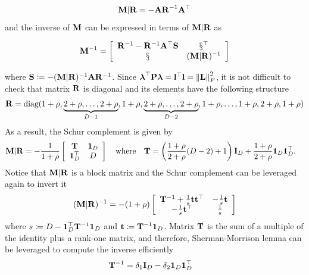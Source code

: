 \begin{equation}
	\mathbf{M}|\mathbf{R} = -\mathbf{A}\mathbf{R}^{-1}\mathbf{A}^\top
\end{equation}
and the inverse of $\mathbf{M}$ can be expressed in terms of $\mathbf{M}|\mathbf{R}$ as
\begin{small}
	\begin{equation}\label{eq:Minv_admm}
		\M^{-1} = \left[
		\begin{array}{cc}
			\Rm^{-1} - \Rm^{-1}\A^\top\S  & \S^\top \\
			\S & (\M|\Rm)^{-1}
		\end{array}
		\right]
	\end{equation}
\end{small}%
where $\S\coloneqq -(\M|\Rm)^{-1}\A\Rm^{-1}$. Since $\boldsymbol{\lambda}^\top \mathbf{P} \boldsymbol{\lambda}= \mathbf{l}^\top \mathbf{l} = \left\|\mathbf{L}\right\|_F^2$, it is not difficult to check that matrix $\mathbf{R}$ is diagonal and its elements have the following structure
\begin{equation}
	\mathbf{R}=\text{diag}(1+\rho, \underbrace{2+\rho,\ldots,2+\rho}_{D-1},1+\rho, \label{eq:R} 
	\underbrace{2+\rho,\ldots,2+\rho}_{D-2},1+\rho,\ldots,1+\rho,2+\rho,1+\rho) 
\end{equation}
As a result, the Schur complement is given by
\begin{align*}
	\mathbf{M}|\mathbf{R} &= -\frac{1}{1+\rho}\left[
	\begin{array}{cc}
		\mathbf{T}  & \mathbf{1}_D \\
		\mathbf{1}_D^\top & D
	\end{array}
	\right]\quad \text{where}\quad
	\mathbf{T} = \left(\frac{1+\rho}{2+\rho}(D-2)+1\right)\mathbf{I}_D + \frac{1+\rho}{2+\rho}\mathbf{1}_D\mathbf{1}_D^\top.
\end{align*}
Notice that $\mathbf{M}|\mathbf{R}$ is a block matrix and the Schur complement can be leveraged again to invert it
\begin{equation*}
	(\mathbf{M}|\mathbf{R})^{-1} = -(1+\rho)\left[
	\begin{array}{cc}
		\mathbf{T}^{-1} + \frac{1}{s}\mathbf{t}\mathbf{t}^\top  & -\frac{1}{s}\mathbf{t} \\
		-\frac{1}{s}\mathbf{t}^\top & \frac{1}{s}
	\end{array}
	\right]
\end{equation*}
where $s\coloneqq D-\mathbf{1}_D^\top\mathbf{T}^{-1}\mathbf{1}_D$ and $\mathbf{t}\coloneqq \mathbf{T}^{-1}\mathbf{1}_D$. Matrix $\mathbf{T}$ is the sum of a multiple of the identity plus a rank-one matrix, and therefore, Sherman-Morrison lemma can be leveraged to compute the inverse efficiently
\begin{align}
	&\mathbf{T}^{-1} = \delta_1\mathbf{I}_D - \delta_2\boldsymbol{1}_D\boldsymbol{1}_D^\top\label{eq:Mschur_inv} 
\end{align}
